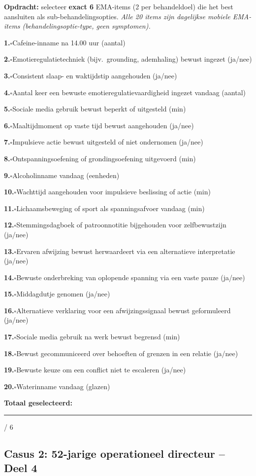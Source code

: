 \documentclass[11pt,a4paper]{article}
\newcommand{\checkitemBFS}[2]{%
\noindent\small\textbf{#1.}\hspace{0.45em}$\square$\hspace{0.4em}#2\par\vspace{0.20em}}
\begin{document}
\begin{responsebox}
\small\textbf{Opdracht:} selecteer \textbf{exact 6} EMA-items (2 per behandeldoel) die het best aansluiten als sub-behandelingsopties.
\textit{Alle 20 items zijn dagelijkse mobiele EMA-items (behandelingsoptie-type, geen symptomen).}

\checkitemBFS{1}{Cafeine-inname na 14.00 uur (aantal)}
\checkitemBFS{2}{Emotieregulatietechniek (bijv.\ grounding, ademhaling) bewust ingezet (ja/nee)}
\checkitemBFS{3}{Consistent slaap- en waktijdstip aangehouden (ja/nee)}
\checkitemBFS{4}{Aantal keer een bewuste emotieregulatievaardigheid ingezet vandaag (aantal)}
\checkitemBFS{5}{Sociale media gebruik bewust beperkt of uitgesteld (min)}
\checkitemBFS{6}{Maaltijdmoment op vaste tijd bewust aangehouden (ja/nee)}
\checkitemBFS{7}{Impulsieve actie bewust uitgesteld of niet ondernomen (ja/nee)}
\checkitemBFS{8}{Ontspanningsoefening of grondingsoefening uitgevoerd (min)}
\checkitemBFS{9}{Alcoholinname vandaag (eenheden)}
\checkitemBFS{10}{Wachttijd aangehouden voor impulsieve beslissing of actie (min)}
\checkitemBFS{11}{Lichaamsbeweging of sport als spanningsafvoer vandaag (min)}
\checkitemBFS{12}{Stemmingsdagboek of patroonnotitie bijgehouden voor zelfbewustzijn (ja/nee)}
\checkitemBFS{13}{Ervaren afwijzing bewust herwaardeert via een alternatieve interpretatie (ja/nee)}
\checkitemBFS{14}{Bewuste onderbreking van oplopende spanning via een vaste pauze (ja/nee)}
\checkitemBFS{15}{Middagdutje genomen (ja/nee)}
\checkitemBFS{16}{Alternatieve verklaring voor een afwijzingssignaal bewust geformuleerd (ja/nee)}
\checkitemBFS{17}{Sociale media gebruik na werk bewust begrensd (min)}
\checkitemBFS{18}{Bewust gecommuniceerd over behoeften of grenzen in een relatie (ja/nee)}
\checkitemBFS{19}{Bewuste keuze om een conflict niet te escaleren (ja/nee)}
\checkitemBFS{20}{Waterinname vandaag (glazen)}
\vspace{0.4em}
\noindent\textbf{Totaal geselecteerd:}\hspace{0.5em}\rule{1.2cm}{0.25pt}\hspace{0.2em}/ 6
\end{responsebox}

\vspace{0.6em}
\newpage
\subsection*{Casus 2: 52-jarige operationeel directeur -- Deel 4}
\end{document}
